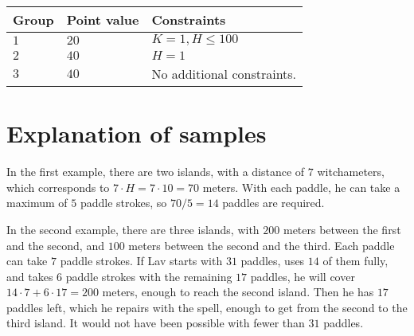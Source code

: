 \noindent
\begin{tabular}{| l | l | p{12cm} |}
  \hline
  \textbf{Group} & \textbf{Point value} & \textbf{Constraints} \\ \hline
  $1$    & $20$        &  $ K = 1, H \leq 100 $ \\ \hline 
  $2$    & $40$        &  $ H = 1 $ \\ \hline
  $3$    & $40$        &  No additional constraints. \\ \hline
\end{tabular}



\section*{Explanation of samples}
In the first example, there are two islands, with a distance of $7$ witchameters, which corresponds to
$7\cdot H = 7\cdot 10=70$ meters. With each paddle, he can take a maximum of $5$ paddle strokes, so
$70/5 = 14$ paddles are required.

In the second example, there are three islands, with $200$ meters between the first and the second, and
$100$ meters between the second and the third. Each paddle can take $7$ paddle strokes. If Lav starts
with $31$ paddles, uses $14$ of them fully, and takes $6$ paddle strokes with the remaining $17$ paddles,
he will cover $14\cdot 7+6\cdot 17=200$ meters, enough to reach the second island. Then he has $17$ paddles
left, which he repairs with the spell, enough to get from the second to the third island. It would not
have been possible with fewer than $31$ paddles.


